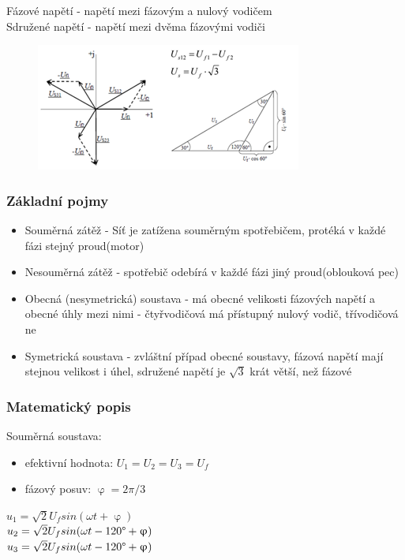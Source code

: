 Fázové napětí - napětí mezi fázovým a nulový vodičem\\
Sdružené napětí - napětí mezi dvěma fázovými vodiči
\begin{figure}[H]
    \includegraphics*[scale = 1.2]{images/sdruzeneNapeti.png}
\end{figure}

\subsubsection*{Základní pojmy}
\begin{itemize}
    \item Souměrná zátěž - Síť je zatížena souměrným spotřebičem, protéká v každé fázi stejný proud(motor)
    \item Nesouměrná zátěž - spotřebič odebírá v každé fázi jiný proud(oblouková pec)
    \item Obecná (nesymetrická) soustava - má obecné velikosti fázových napětí a obecné úhly mezi nimi - čtyřvodičová má přístupný nulový vodič, třívodičová ne
    \item Symetrická soustava - zvláštní případ obecné soustavy, fázová napětí mají stejnou velikost i úhel, sdružené napětí je $\sqrt{3}$ krát větší, než fázové
\end{itemize}

\subsubsection*{Matematický popis}
Souměrná soustava:
\begin{itemize}
    \item efektivní hodnota: $U_1 = U_2 = U_3 = U_f$
    \item fázový posuv: $\upvarphi = 2\pi /3$
\end{itemize}
$u_1 = \sqrt{2}U_fsin(\omega t +\upvarphi)$\\
$u_2 = \sqrt{2}U_fsin(\omega t -120\degree +\upvarphi)$\\
$u_3 = \sqrt{2}U_fsin(\omega t -120\degree +\upvarphi)$\\


